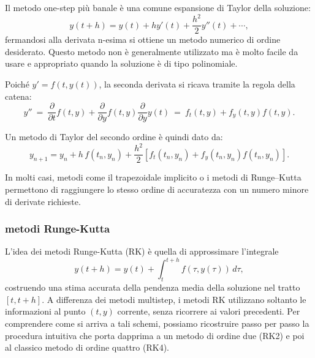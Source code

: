 \documentclass{article}
\begin{document}
	Il metodo one-step più banale è una comune espansione di Taylor della soluzione:
	\[
	y(t+h) = y(t) + hy'(t) + \frac{h^2}{2}y''(t) + \cdots,
	\]
	fermandosi alla derivata n-esima si ottiene un metodo numerico di ordine desiderato. Questo metodo non è generalmente utilizzato ma è molto facile da usare e appropriato quando la soluzione è di tipo polinomiale.
	
	Poiché $y' = f(t, y(t))$, la seconda derivata si ricava tramite la regola della catena:
	\[
	y'' \ =\ \frac{\partial}{\partial t}f(t,y) + \frac{\partial}{\partial y}f(t,y) \frac{\partial}{\partial y} y(t)
	\ =\ f_t(t,y) + f_y(t,y) f(t,y).
	\]
	
	Un metodo di Taylor del secondo ordine è quindi dato da:
	\[
	y_{n+1}
	= y_n
	+ h\, f(t_n, y_n)
	+ \frac{h^2}{2}
	\left[
	f_t(t_n,y_n)
	+ f_y(t_n,y_n) f(t_n,y_n)
	\right].
	\]
	
	In molti casi, metodi come il trapezoidale implicito o i metodi di Runge--Kutta
	permettono di raggiungere lo stesso ordine di accuratezza con un numero minore di derivate richieste.
	
	
	\subsubsection{metodi Runge-Kutta}
	
	L'idea dei metodi Runge-Kutta (RK) è quella di approssimare l'integrale
	\[
	y(t+h) = y(t) + \int_{t}^{t+h} f(\tau, y(\tau))\, d\tau,
	\]
	costruendo una stima accurata della pendenza media della soluzione nel tratto
	$[t, t+h]$. A differenza dei metodi multistep, i metodi RK utilizzano soltanto
	le informazioni al punto $(t,y)$ corrente, senza ricorrere ai valori precedenti.
	Per comprendere come si arriva a tali schemi, possiamo ricostruire passo per passo 
	la procedura intuitiva che porta dapprima a un metodo di ordine due (RK2) e poi
	al classico metodo di ordine quattro (RK4).
	
\end{document}
